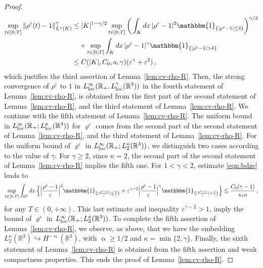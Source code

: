 \documentclass[11pt,reqno]{amsart}
\def \R{{\mathbb{R}}}
\begin{document}
\begin{proof}
\begin{align*}
 \sup_{t\in [0,T]} \|\rho^\varepsilon(t) -1\|_{L^\gamma(K)}^\gamma
  & \leq |K|^{1-\gamma/2}  \sup_{t\in [0,T]} \bigg(\int_K dx\, |\rho^\varepsilon -1|^2
  \mathbbm{1}_{\{|{\rho^\varepsilon-1}|\leq \delta\}} \bigg)^{\gamma/2} \\
  & \quad + \sup_{t\in [0,T]} \int_K dx\, |\rho^\varepsilon -1|^\gamma
\mathbbm{1}_{\{|{\rho^\varepsilon-1}|> \delta\}} \\
& \leq C(|K|, C_0,  a,  \gamma) (\varepsilon^\gamma + \varepsilon^2) \,,
\end{align*}
which justifies the third assertion of Lemma~\ref{lem:cv-rho-R}. Then, the strong convergence of $\rho^\varepsilon$ to $1$ in $L_{\rm loc}^\infty(\R_+, L_{\rm loc}^\gamma(\R^3))$ in the fourth statement of Lemma~\ref{lem:cv-rho-R}, is obtained from the first part of the second statement of Lemma~\ref{lem:cv-rho-R}, and the third statement of Lemma~\ref{lem:cv-rho-R}. We continue with the fifth statement of Lemma~\ref{lem:cv-rho-R}. The uniform bound in $L_{\rm loc}^\infty(\R_+; L_{\rm loc }^\kappa(\R^3))$ for $\varrho^\varepsilon$ comes from the second part of the second statement of Lemma~\ref{lem:cv-rho-R}, and the third statement of Lemma~\ref{lem:cv-rho-R}. For the uniform  bound of  $\varrho^\varepsilon$ in $L_{\rm loc}^\infty(\R_+; L_2^\kappa(\R^3))$, we distinguish two cases according to the value of $\gamma$. For $\gamma \geq 2$, since $\kappa=2$, the second part of the second statement of Lemma~\ref{lem:cv-rho-R} implies the fifth one. For $1<\gamma <2$, estimate \eqref{eqn:bdze} leads to
\[
\sup_{t\in[0,T]}  \int_{\R^3}dx \, \Big\{ \Big|\frac{\rho^\varepsilon-1}{\varepsilon}\Big|^2
\mathbbm{1}_{\{|\frac{\rho^\varepsilon-1}{\varepsilon}|\leq \frac{ \delta}{\varepsilon}\}} + 
\varepsilon^{\gamma-2}\Big|\frac{\rho^\varepsilon-1}{\varepsilon}\Big|^\gamma
\mathbbm{1}_{\{|\frac{\rho^\varepsilon-1}{\varepsilon}|> \frac{ \delta}{\varepsilon}\}}
\Big\} \leq \frac{C_0(\gamma-1)}{\kappa_1 a}\,,
\]
for any $T\in (0,+\infty)$. This last  estimate and  inequality $\varepsilon^{\gamma-2}>1$, imply the bound of $\varrho^\varepsilon$ in $L_{\rm loc}^\infty(\R_+; L_2^\kappa(\R^3))$. To complete the fifth assertion of Lemma~\ref{lem:cv-rho-R}, we observe, as above, that we have the embedding $L_2^\kappa(\R^3) \hookrightarrow H^{-\upalpha}(\R^3)$, with $\upalpha \geq 1/2$ and $\kappa=\min\{2,\gamma\}$. Finally, the sixth statement of Lemma~\ref{lem:cv-rho-R} is obtained from the fifth assertion and weak compactness properties. This ends the proof of Lemma~\ref{lem:cv-rho-R}.
\end{proof}  
\end{document}

